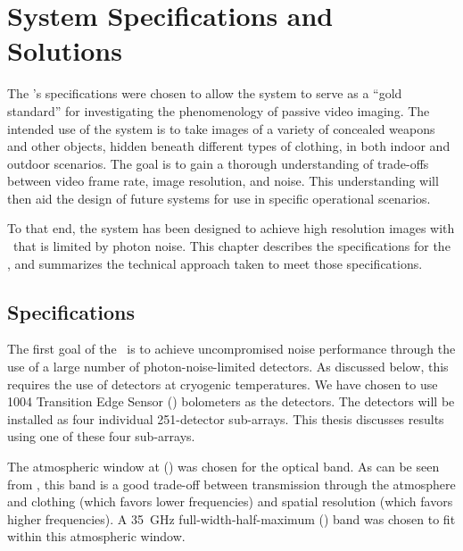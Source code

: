 \chapter{System Specifications and Solutions}\label{c:specs}


The \Imager's specifications were chosen to allow the system to serve as a ``gold standard'' for investigating the phenomenology of passive video imaging.
The intended use of the system is to take images of a variety of concealed weapons and other objects, hidden beneath different types of clothing, in both indoor and outdoor scenarios.
The goal is to gain a thorough understanding of trade-offs between video frame rate, image resolution, and noise.
This understanding will then aid the design of future systems for use in specific operational scenarios.

To that end, the system has been designed to achieve high resolution images with \NETD\ that is limited by photon noise.
This chapter describes the specifications for the \Imager, and summarizes the technical approach taken to meet those specifications.

\section{Specifications} \label{sec:ch2-specifications}

The first goal of the \Imager\ is to achieve uncompromised noise performance through the use of a large number of photon-noise-limited detectors.
As discussed below, this requires the use of detectors at cryogenic temperatures.
We have chosen to use 1004 Transition Edge Sensor (\TES) bolometers as the detectors.
The detectors will be installed as four individual 251-detector sub-arrays.
This thesis discusses results using one of these four sub-arrays.

The atmospheric window at  () was chosen for the optical band.
As can be seen from , this band is a good trade-off between transmission through the atmosphere and clothing (which favors lower frequencies) and spatial resolution (which favors higher frequencies).
A \SI{35}{\GHz} full-width-half-maximum (\FWHM) band was chosen to fit within this atmospheric window.

